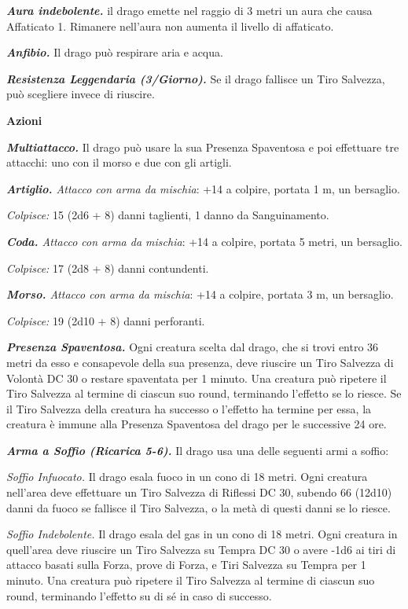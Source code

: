 \begin{multicols}{2}
{\emph{\textbf{Aura indebolente.}} il drago emette nel raggio di 3 metri un aura che causa Affaticato 1. Rimanere nell'aura non aumenta il livello di affaticato.

\emph{\textbf{Anfibio.}} Il drago può respirare aria e acqua.

\emph{\textbf{Resistenza Leggendaria (3/Giorno).}} Se il drago fallisce un Tiro Salvezza, può scegliere invece di riuscire.

\textbf{Azioni}

\emph{\textbf{Multiattacco.}} Il drago può usare la sua Presenza Spaventosa e poi effettuare tre attacchi: uno con il morso e due con gli artigli.

\emph{\textbf{Artiglio.} Attacco con arma da mischia}: +14 a colpire, portata 1 m, un bersaglio.

\emph{Colpisce:} 15 (2d6 + 8) danni taglienti, 1 danno da Sanguinamento.

\emph{\textbf{Coda.} Attacco con arma da mischia}: +14 a colpire, portata 5 metri, un bersaglio.

\emph{Colpisce:} 17 (2d8 + 8) danni contundenti.

\emph{\textbf{Morso.} Attacco con arma da mischia}: +14 a colpire, portata 3 m, un bersaglio.

\emph{Colpisce:} 19 (2d10 + 8) danni perforanti.

\emph{\textbf{Presenza Spaventosa.}} Ogni creatura scelta dal drago, che si trovi entro 36 metri da esso e consapevole della sua presenza, deve riuscire un Tiro Salvezza di Volontà DC 30 o restare spaventata per 1 minuto. Una creatura può ripetere il Tiro Salvezza al termine di ciascun suo round, terminando l'effetto se lo riesce. Se il Tiro Salvezza della creatura ha successo o l'effetto ha termine per essa, la creatura è immune alla Presenza Spaventosa del drago per le successive 24 ore.

\emph{\textbf{Arma a Soffio (Ricarica 5-6).}} Il drago usa una delle seguenti armi a soffio:

\emph{Soffio Infuocato.} Il drago esala fuoco in un cono di 18 metri. Ogni creatura nell'area deve effettuare un Tiro Salvezza di Riflessi DC 30, subendo 66 (12d10) danni da fuoco se fallisce il Tiro Salvezza, o la metà di questi danni se lo riesce.

\emph{Soffio Indebolente.} Il drago esala del gas in un cono di 18 metri. Ogni creatura in quell'area deve riuscire un Tiro Salvezza su Tempra DC 30 o avere -1d6 ai tiri di attacco basati sulla Forza, prove di Forza, e Tiri Salvezza su Tempra per 1 minuto. Una creatura può ripetere il Tiro Salvezza al termine di ciascun suo round, terminando l'effetto su di sé in caso di successo.

}
\end{multicols}
